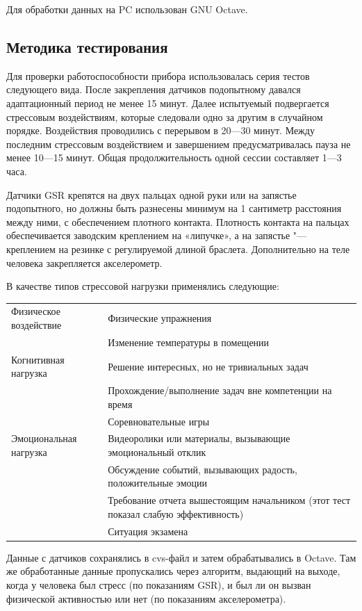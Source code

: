 \documentclass[10pt, a5paper]{article}
\begin{document}
Для обработки данных на PC использован GNU Octave.

\subsection*{Методика тестирования}

Для проверки работоспособности прибора использовалась серия тестов следующего вида. После закрепления датчиков подопытному давался адаптационный период не менее 15 минут. Далее испытуемый подвергается стрессовым воздействиям, которые следовали одно за другим в случайном порядке. Воздействия проводились с перерывом в 20—30 минут. Между последним стрессовым воздействием и завершением предусматривалась пауза не менее 10—15 минут. Общая продолжительность одной сессии составляет 1—3 часа.

Датчики GSR крепятся на двух пальцах одной руки или на запястье подопытного, но должны быть разнесены минимум на 1 сантиметр расстояния между ними, с обеспечением плотного контакта. Плотность контакта на пальцах обеспечивается заводским креплением на «липучке», а на запястье "--- креплением на резинке с регулируемой длиной браслета. Дополнительно на теле человека закрепляется акселерометр.

В качестве типов стрессовой нагрузки применялись следующие:
\begin{center}
  \begin{longtable}{P{10em}|P{20em}}
    \hline
    Физическое воздействие & Физические упражнения \\
     & Изменение температуры в помещении \\
    \hline
    Когнитивная нагрузка & Решение интересных, но не тривиальных задач \\[-2ex]
     & Прохождение/выполнение задач вне компетенции на время \\[-2ex]
     & Соревновательные игры \\
    \hline
    Эмоциональная нагрузка & Видеоролики или материалы, вызывающие эмоциональный отклик \\
     & Обсуждение событий, вызывающих радость, положительные эмоции \\
     & Требование отчета вышестоящим начальником (этот тест показал слабую эффективность) \\
     & Ситуация экзамена \\
    \hline
  \end{longtable}
\end{center}
Данные с датчиков сохранялись в cvs-файл и затем обрабатывались в Octave. Там же обработанные данные пропускались через алгоритм, выдающий на выходе, когда у человека был стресс (по показаниям GSR), и был ли он вызван физической активностью или нет (по показаниям акселерометра).
\end{document}

